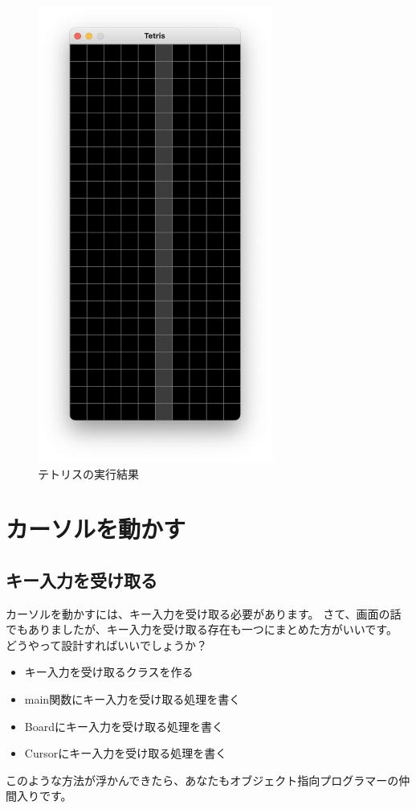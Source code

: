 \documentclass[12pt, a4paper, dvipdfmx]{book}
\begin{document}
\begin{figure}
  \centering
  \includegraphics[height=15cm, natwidth=824,natheight=1600]{TetrisCH5.png}
  \caption{テトリスの実行結果}
\end{figure}

\section{カーソルを動かす}
\subsection{キー入力を受け取る}
カーソルを動かすには、キー入力を受け取る必要があります。
さて、画面の話でもありましたが、キー入力を受け取る存在も一つにまとめた方がいいです。
どうやって設計すればいいでしょうか？
\begin{itemize}
  \item キー入力を受け取るクラスを作る
  \item main関数にキー入力を受け取る処理を書く
  \item Boardにキー入力を受け取る処理を書く
  \item Cursorにキー入力を受け取る処理を書く
\end{itemize}
このような方法が浮かんできたら、あなたもオブジェクト指向プログラマーの仲間入りです。
\end{document}
